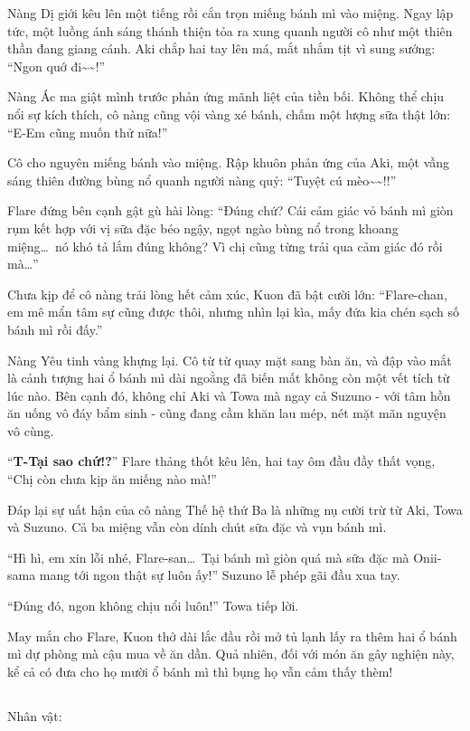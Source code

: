 \documentclass[../main.tex]{subfiles}
\begin{document}
Nàng Dị giới kêu lên một tiếng rồi cắn trọn miếng bánh mì vào miệng. Ngay lập tức, một luồng ánh sáng thánh thiện tỏa ra xung quanh người cô như một thiên thần đang giang cánh. Aki chắp hai tay lên má, mắt nhắm tịt vì sung sướng: ``Ngon quớ đi\~{}\~{}!''

Nàng Ác ma giật mình trước phản ứng mãnh liệt của tiền bối. Không thể chịu nổi sự kích thích, cô nàng cũng vội vàng xé bánh, chấm một lượng sữa thật lớn: ``E-Em cũng muốn thử nữa!''

Cô cho nguyên miếng bánh vào miệng. Rập khuôn phản ứng của Aki, một vầng sáng thiên đường bùng nổ quanh người nàng quỷ: ``Tuyệt cú mèo\~{}\~{}!!''

Flare đứng bên cạnh gật gù hài lòng: ``Đúng chứ? Cái cảm giác vỏ bánh mì giòn rụm kết hợp với vị sữa đặc béo ngậy, ngọt ngào bùng nổ trong khoang miệng\dots\ nó khó tả lắm đúng không? Vì chị cũng từng trải qua cảm giác đó rồi mà\dots''

Chưa kịp để cô nàng trải lòng hết cảm xúc, Kuon đã bật cười lớn: ``Flare-chan, em mê mẩn tâm sự cũng được thôi, nhưng nhìn lại kìa, mấy đứa kia chén sạch số bánh mì rồi đấy.''

Nàng Yêu tinh vàng khựng lại. Cô từ từ quay mặt sang bàn ăn, và đập vào mắt là cảnh tượng hai ổ bánh mì dài ngoằng đã biến mất không còn một vết tích từ lúc nào. Bên cạnh đó, không chỉ Aki và Towa mà ngay cả Suzuno - với tâm hồn ăn uống vô đáy bẩm sinh - cũng đang cầm khăn lau mép, nét mặt mãn nguyện vô cùng.

``\textbf{T-Tại sao chứ!?}'' Flare thảng thốt kêu lên, hai tay ôm đầu đầy thất vọng, ``Chị còn chưa kịp ăn miếng nào mà!''

Đáp lại sự uất hận của cô nàng Thế hệ thứ Ba là những nụ cười trừ từ Aki, Towa và Suzuno. Cả ba miệng vẫn còn dính chút sữa đặc và vụn bánh mì.

``Hì hì, em xin lỗi nhé, Flare-san\dots\ Tại bánh mì giòn quá mà sữa đặc mà Onii-sama mang tới ngon thật sự luôn ấy!'' Suzuno lễ phép gãi đầu xua tay.

``Đúng đó, ngon không chịu nổi luôn!'' Towa tiếp lời.

May mắn cho Flare, Kuon thở dài lắc đầu rồi mở tủ lạnh lấy ra thêm hai ổ bánh mì dự phòng mà cậu mua về ăn dần. Quả nhiên, đối với món ăn gây nghiện này, kể cả có đưa cho họ mười ổ bánh mì thì bụng họ vẫn cảm thấy thèm!

\newpage

\subsection*{\label{ep-C9.II}}
\vspace{-4pt}
\begin{center}
  {\caviar\fontsize{12pt}{12pt}\selectfont Nhân vật:     }
\end{center}
\end{document}
